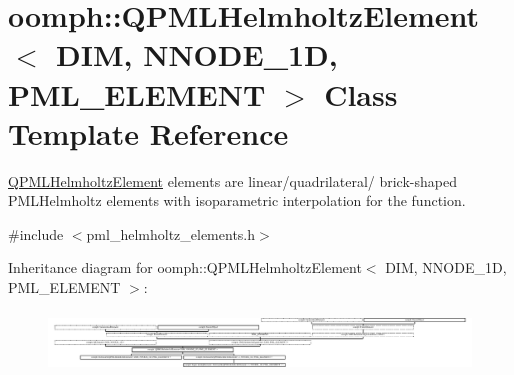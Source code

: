 \hypertarget{classoomph_1_1QPMLHelmholtzElement}{}\section{oomph\+:\+:Q\+P\+M\+L\+Helmholtz\+Element$<$ D\+IM, N\+N\+O\+D\+E\+\_\+1D, P\+M\+L\+\_\+\+E\+L\+E\+M\+E\+NT $>$ Class Template Reference}
\label{classoomph_1_1QPMLHelmholtzElement}


\hyperlink{classoomph_1_1QPMLHelmholtzElement}{Q\+P\+M\+L\+Helmholtz\+Element} elements are linear/quadrilateral/ brick-\/shaped P\+M\+L\+Helmholtz elements with isoparametric interpolation for the function.  




{\ttfamily \#include $<$pml\+\_\+helmholtz\+\_\+elements.\+h$>$}

Inheritance diagram for oomph\+:\+:Q\+P\+M\+L\+Helmholtz\+Element$<$ D\+IM, N\+N\+O\+D\+E\+\_\+1D, P\+M\+L\+\_\+\+E\+L\+E\+M\+E\+NT $>$\+:\begin{figure}[H]
\begin{center}
\leavevmode
\includegraphics[height=1.630616cm]{classoomph_1_1QPMLHelmholtzElement}
\end{center}
\end{figure}
